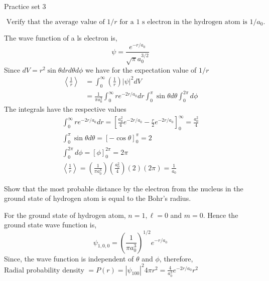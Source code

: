 \newpage
\begin{abox}
	Practice set 3
	\end{abox}
\begin{enumerate}
	\begin{minipage}{\textwidth}
	\item $\text { Verify that the average value of } 1 / r \text { for a } 1 \text { s electron in the hydrogen atom is } 1 / a_{0} \text {. }$
\end{minipage}
	\begin{answer}
		The wave function of a ls electron is,
		$$
		\psi=\frac{e^{-r / a_{0}}}{\sqrt{\pi} a_{0}^{3 / 2}}
		$$
		Since $d V=r^{2} \sin \theta d r d \theta d \phi$ we have for the expectation value of $1 / r$
		$$
		\begin{aligned}
		\left\langle\frac{1}{r}\right\rangle &=\int_{0}^{\infty}\left(\frac{1}{r}\right)|\psi|^{2} d V \\
		&=\frac{1}{\pi a_{0}^{3}} \int_{0}^{\infty} r e^{-2 r / a_{0}} d r \int_{0}^{\pi} \sin \theta d \theta \int_{0}^{2 \pi} d \phi
		\end{aligned}
		$$
		The integrals have the respective values
		$$
		\begin{gathered}
		\int_{0}^{\infty} r e^{-2 r / a_{0}} d r=\left[\frac{a_{0}^{2}}{4} e^{-2 r / a_{0}}-\frac{r}{2} e^{-2 r / a_{0}}\right]_{0}^{\infty}=\frac{a_{0}^{2}}{4} \\
		\int_{0}^{\pi} \sin \theta d \theta=[-\cos \theta]_{0}^{\pi}=2 \\
		\int_{0}^{2 \pi} d \phi=[\phi]_{0}^{2 \pi}=2 \pi \\
		\left\langle\frac{1}{r}\right\rangle=\left(\frac{1}{\pi a_{0}^{3}}\right)\left(\frac{a_{0}^{2}}{4}\right)(2)(2 \pi)=\frac{1}{a_{0}}
		\end{gathered}
		$$	
	\end{answer}
		\begin{minipage}{\textwidth}
		\item 	Show that the most probable distance by the electron from the nucleus in the ground state of hydrogen atom is equal to the Bohr's radius.
	\end{minipage}
	\begin{answer}
		For the ground state of hydrogen atom, $n=1, \ell=0$ and $m=0$. Hence the ground state wave function is,
		$$
		\psi_{1,0,0}=\left(\frac{1}{\pi a_{0}^{3}}\right)^{1 / 2} e^{-r / a_{0}}
		$$
		Since, the wave function is independent of $\theta$ and $\phi$, therefore,\\
		Radial probability density $=P(r)=\left|\psi_{100}\right|^{2} 4 \pi r^{2}=\frac{4}{a_{0}^{3}} e^{-2 r / a_{0}} r^{2}$

\end{answer}
\end{enumerate}
